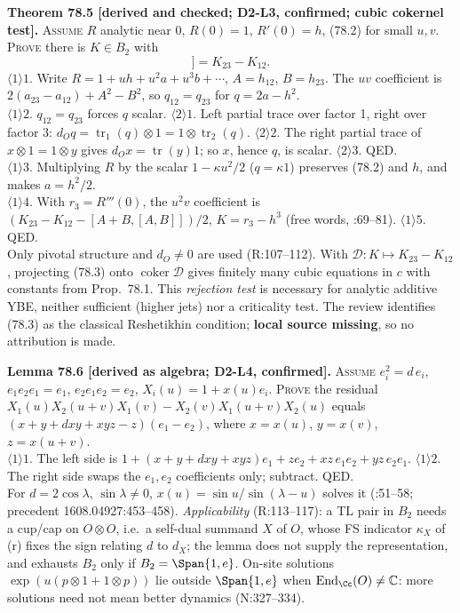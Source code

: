 \textbf{Theorem 78.5 [derived and checked; D2-L3, confirmed; cubic cokernel test].} \textsc{Assume}
\(R\) analytic near \(0\), \(R(0)=1\), \(R'(0)=h\), (78.2) for small \(u,v\). \textsc{Prove} there
is \(K\in B_2\) with
\begin{equation}
  [h_{12}+h_{23},[h_{12},h_{23}]]=K_{23}-K_{12}.
  \tag{78.3}
\end{equation}
\(\langle1\rangle1\). Write \(R=1+uh+u^2a+u^3b+\cdots\), \(A=h_{12}\), \(B=h_{23}\).  The \(uv\)
coefficient is \(2(a_{23}-a_{12})+A^2-B^2\), so \(q_{12}=q_{23}\) for \(q=2a-h^2\).\\
\(\langle1\rangle2\). \(q_{12}=q_{23}\) forces \(q\) scalar. \(\langle2\rangle1\). Left partial
trace over factor 1, right over factor 3:
\(d_Oq=\operatorname{tr}_1(q)\otimes1=1\otimes\operatorname{tr}_2(q)\). \(\langle2\rangle2\). The
right partial trace of \(x\otimes1=1\otimes y\) gives \(d_Ox=\operatorname{tr}(y)1\); so \(x\),
hence \(q\), is scalar.  \(\langle2\rangle3\). QED.\\ \(\langle1\rangle3\). Multiplying \(R\) by the
scalar \(1-\kappa u^2/2\) (\(q=\kappa1\)) preserves (78.2) and \(h\), and makes \(a=h^2/2\).\\
\(\langle1\rangle4\). With \(r_3=R'''(0)\), the \(u^2v\) coefficient is
\((K_{23}-K_{12}-[A{+}B,[A,B]])/2\), \(K=r_3-h^3\) (free words, :69--81).
\(\langle1\rangle5\). QED.\\ Only pivotal structure and \(d_O\neq0\) are used (R:107--112).  With
\(\mathcal D:K\mapsto K_{23}-K_{12}\), projecting (78.3) onto \(\operatorname{coker}\mathcal D\)
gives finitely many cubic equations in \(c\) with constants from Prop.~78.1.  This \emph{rejection
test} is necessary for analytic additive YBE, neither sufficient (higher jets) nor a criticality
test.  The review identifies (78.3) as the classical Reshetikhin condition; \textbf{local source
missing}, so no attribution is made.

\textbf{Lemma 78.6 [derived as algebra; D2-L4, confirmed].}  \textsc{Assume} \(e_i^2=d\,e_i\),
\(e_1e_2e_1=e_1\), \(e_2e_1e_2=e_2\), \(X_i(u)=1+x(u)e_i\).  \textsc{Prove} the residual \(X_1(u)X_2(u{+}v)X_1(v)-X_2(v)X_1(u{+}v)X_2(u)\) equals
\((x+y+dxy+xyz-z)(e_1-e_2)\), where \(x=x(u)\), \(y=x(v)\), \(z=x(u{+}v)\).\\ \(\langle1\rangle1\).
The left side is \(1+(x{+}y{+}dxy{+}xyz)e_1+ze_2+xz\,e_1e_2+yz\,e_2e_1\). \(\langle1\rangle2\). The
right side swaps the \(e_1,e_2\) coefficients only; subtract.  QED.\\ For \(d=2\cos\lambda\),
\(\sin\lambda\neq0\), \(x(u)=\sin u/\sin(\lambda-u)\) solves it (:51--58;
precedent 1608.04927:453--458).  \emph{Applicability} (R:113--117): a TL pair in \(B_2\) needs a
cup/cap on \(O\otimes O\), i.e.\ a self-dual summand \(X\) of \(O\), whose FS indicator \(\kappa_X\)
of (r) fixes the sign relating \(d\) to \(d_X\); the lemma does not supply the representation, and
exhausts \(B_2\) only if \(B_2=\Span\{1,e\}\).  On-site solutions \(\exp(u(p\otimes1+1\otimes p))\)
lie outside \(\Span\{1,e\}\) when \(\operatorname{End}_\Cc(O)\neq\mathbb C\): more solutions need
not mean better dynamics (N:327--334).

